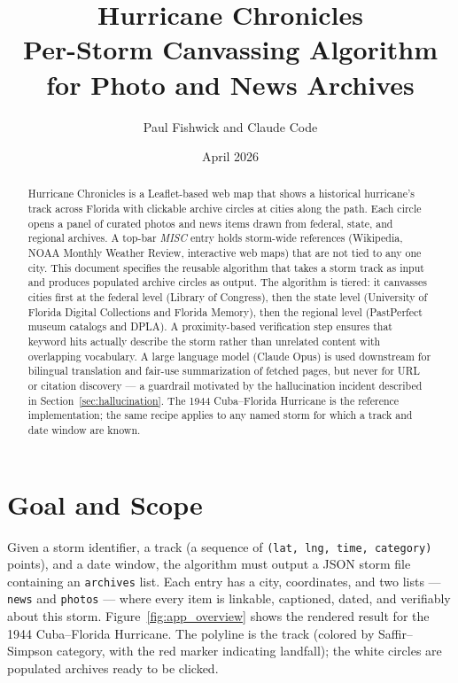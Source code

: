 \documentclass[11pt,letterpaper]{article}
\title{Hurricane Chronicles\\ \large Per-Storm Canvassing Algorithm for Photo and News Archives}
\author{Paul Fishwick and Claude Code}
\date{April 2026}
\begin{document}
\maketitle

\begin{abstract}
Hurricane Chronicles is a Leaflet-based web map that shows a historical hurricane's track across Florida with clickable archive circles at cities along the path. Each circle opens a panel of curated photos and news items drawn from federal, state, and regional archives. A top-bar \emph{MISC} entry holds storm-wide references (Wikipedia, NOAA Monthly Weather Review, interactive web maps) that are not tied to any one city. This document specifies the reusable algorithm that takes a storm track as input and produces populated archive circles as output. The algorithm is tiered: it canvasses cities first at the federal level (Library of Congress), then the state level (University of Florida Digital Collections and Florida Memory), then the regional level (PastPerfect museum catalogs and DPLA). A proximity-based verification step ensures that keyword hits actually describe the storm rather than unrelated content with overlapping vocabulary. A large language model (Claude Opus) is used downstream for bilingual translation and fair-use summarization of fetched pages, but never for URL or citation discovery --- a guardrail motivated by the hallucination incident described in Section~\ref{sec:hallucination}. The 1944 Cuba--Florida Hurricane is the reference implementation; the same recipe applies to any named storm for which a track and date window are known.
\end{abstract}

\tableofcontents
\newpage

\section{Goal and Scope}

Given a storm identifier, a track (a sequence of \texttt{(lat, lng, time, category)} points), and a date window, the algorithm must output a JSON storm file containing an \texttt{archives} list. Each entry has a city, coordinates, and two lists --- \texttt{news} and \texttt{photos} --- where every item is linkable, captioned, dated, and verifiably about this storm. Figure~\ref{fig:app_overview} shows the rendered result for the 1944 Cuba--Florida Hurricane. The polyline is the track (colored by Saffir--Simpson category, with the red marker indicating landfall); the white circles are populated archives ready to be clicked.
\end{document}
